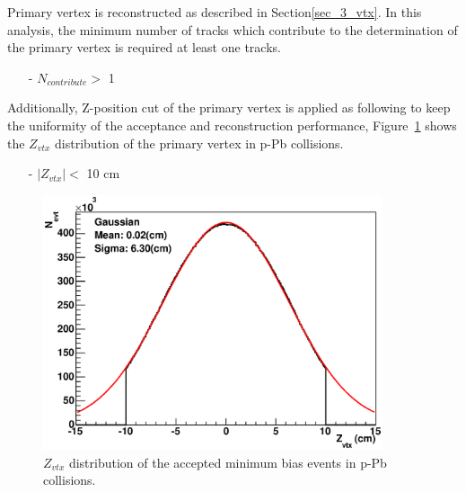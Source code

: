 Primary vertex is reconstructed as described in Section\ref{sec_3_vtx}. 
In this analysis, the minimum number of tracks which contribute to the determination of the primary vertex is required at least one tracks. 
\begin{itemize}
\item[-] $N_{contribute} >$ 1
\end{itemize}
Additionally, Z-position cut of the primary vertex is applied as following to keep the uniformity of the acceptance and reconstruction performance,  
Figure~\ref{fig_4_zvtx} shows the $Z_{vtx}$ distribution of the primary vertex in p-Pb collisions. 
\begin{itemize}
\item[-] $|Z_{vtx}| < $ 10 cm
\end{itemize} 
\begin{figure}[!h]
  \centering
  \includegraphics[width=10cm]{chap4/figure/QA/Zvtx_INT7.eps}
  \caption{$Z_{vtx}$ distribution of the accepted minimum bias events in p-Pb collisions.}
  \label{fig_4_zvtx}
\end{figure}


